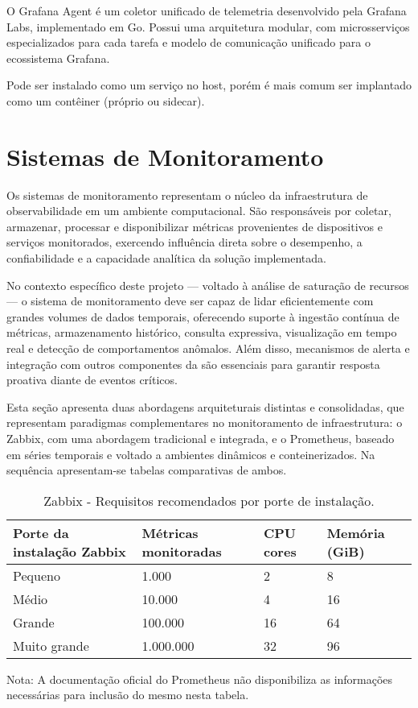 O Grafana Agent \citep{grafanaagent2025} é um coletor unificado de telemetria desenvolvido pela Grafana Labs, implementado em Go. Possui uma arquitetura modular, com microsserviços especializados para cada tarefa e modelo de comunicação  unificado para o ecossistema Grafana.

Pode ser instalado como um serviço no host, porém é mais comum ser implantado como um contêiner (próprio ou sidecar).


\section{Sistemas de Monitoramento}
\label{section:SistemasMonitoramento}

Os sistemas de monitoramento representam o núcleo da infraestrutura de observabilidade em um ambiente computacional. São responsáveis por coletar, armazenar, processar e disponibilizar métricas provenientes de dispositivos e serviços monitorados, exercendo influência direta sobre o desempenho, a confiabilidade e a capacidade analítica da solução implementada.

No contexto específico deste projeto --- voltado à análise de saturação de recursos --- o sistema de monitoramento deve ser capaz de lidar eficientemente com grandes volumes de dados temporais, oferecendo suporte à ingestão contínua de métricas, armazenamento histórico, consulta expressiva, visualização em tempo real e detecção de comportamentos anômalos. Além disso, mecanismos de alerta e integração com outros componentes da  são essenciais para garantir resposta proativa diante de eventos críticos.

Esta seção apresenta duas abordagens arquiteturais distintas e consolidadas, que representam paradigmas complementares no monitoramento de infraestrutura: o Zabbix, com uma abordagem tradicional e integrada, e o Prometheus, baseado em séries temporais e voltado a ambientes dinâmicos e conteinerizados. Na sequência apresentam-se tabelas comparativas de ambos.

\begin{table}[H]
\centering
\caption{Zabbix - Requisitos recomendados por porte de instalação.}
\label{tab:requisitos-zabbix}
\renewcommand{\arraystretch}{1.15}
\begin{tabularx}{\textwidth}{@{}p{4cm} X X X@{}}
\toprule
\textbf{Porte da instalação Zabbix} & \textbf{Métricas monitoradas} & \textbf{CPU cores} & \textbf{Memória (GiB)} \\
\midrule
Pequeno     & 1.000       & 2   & 8   \\
Médio       & 10.000      & 4   & 16  \\
Grande       & 100.000     & 16  & 64  \\
Muito grande & 1.000.000 & 32  & 96  \\
\bottomrule
\end{tabularx}
\begin{flushleft}
\footnotesize
Nota: A documentação oficial do Prometheus não disponibiliza as informações necessárias para inclusão do mesmo nesta tabela.
\end{flushleft}
\end{table}



